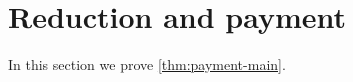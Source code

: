
\section{Reduction and payment}\label{sec:payment}


In this section we prove \cref{thm:payment-main}. %












